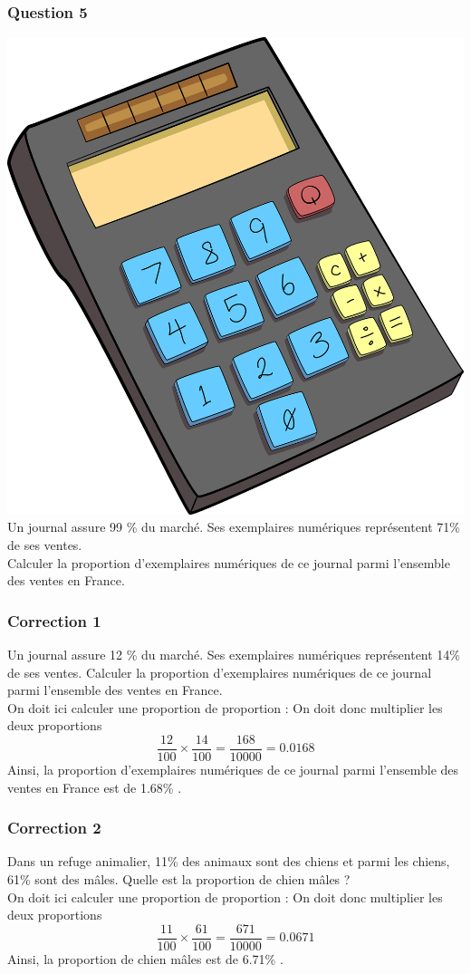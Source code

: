 \documentclass[15pt, mathserif]{beamer}
\begin{document}
\begin{frame} 
	\frametitle{Question 5}
\includegraphics[scale=0.01]{calculatrice} Un journal assure 99 \% du marché. Ses exemplaires numériques représentent 71\% de ses ventes. \\ Calculer la proportion d'exemplaires numériques de ce journal parmi l'ensemble des ventes en France.\end{frame}


\begin{frame}
\vspace{-10mm}
	\frametitle{Correction 1}
Un journal assure 12 \% du marché. Ses exemplaires numériques représentent 14\% de ses ventes. Calculer la proportion d'exemplaires numériques de ce journal parmi l'ensemble des ventes en France.\\ On doit ici calculer une proportion de proportion : On doit donc multiplier les deux proportions $$ \dfrac{12}{100} \times \dfrac{14}{100} = \dfrac{168}{10000} = 0.0168$$ Ainsi, la proportion d’exemplaires numériques de ce journal parmi l’ensemble des ventes en France est de 1.68\% .\end{frame}


\begin{frame}
\vspace{-10mm}
	\frametitle{Correction 2}
Dans un refuge animalier, 11\% des animaux sont des chiens et parmi les chiens, 61\% sont des mâles.  Quelle est la proportion de chien mâles ? \\ On doit ici calculer une proportion de proportion : On doit donc multiplier les deux proportions $$ \dfrac{11}{100} \times \dfrac{61}{100} = \dfrac{671}{10000} = 0.0671$$ Ainsi, la proportion de chien mâles est de 6.71\% .\end{frame}
\end{document}
